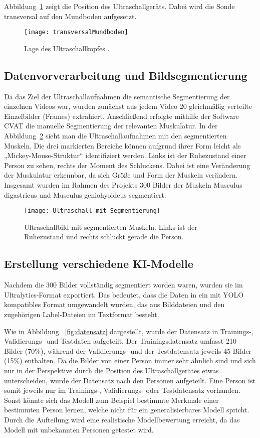 \documentclass[
	german,
	accentcolor=10c,%
	type=intern,
	marginpar=false
	]{tudapub}
\begin{document}
Abbildung~\ref{fig:transversalMundboden} zeigt die Position des Ultraschallgeräts. Dabei wird die Sonde transversal auf den Mundboden aufgesetzt. 

\begin{figure}[H]
    \centering
    \texttt{[image: transversalMundboden]}
    \caption{Lage des Ultraschallkopfes \cite{mundboden}.}
    \label{fig:transversalMundboden}
\end{figure}

\subsection{Datenvorverarbeitung und Bildsegmentierung}
Da das Ziel der Ultraschallaufnahmen die semantische Segmentierung der einzelnen Videos war, wurden zunächst aus jedem Video 20 gleichmäßig verteilte Einzelbilder (Frames) extrahiert. Anschließend erfolgte mithilfe der Software CVAT die manuelle Segmentierung der relevanten Muskulatur. In der Abbildung~\ref{fig:Ultraschall_mit_Segmentierung} sieht man die Ultraschallaufnahmen mit den segmentierten Muskeln. Die drei markierten Bereiche können aufgrund ihrer Form leicht als „Mickey-Mouse-Struktur“ identifiziert werden. Links ist der Ruhezustand einer Person zu sehen, rechts der Moment des Schluckens. Dabei ist eine Veränderung der Muskulatur erkennbar, da sich Größe und Form der Muskeln verändern. Insgesamt wurden im Rahmen des Projekts 300 Bilder der Muskeln Musculus digastricus und Musculus geniohyoideus segmentiert. 

\begin{figure}[H]
    \centering
    \texttt{[image: Ultraschall\_mit\_Segmentierung]}
    \caption{Ultraschallbild mit segmentierten Muskeln. Links ist der Ruhezustand und rechts schluckt gerade die Person.}
    \label{fig:Ultraschall_mit_Segmentierung}
\end{figure}

\subsection{Erstellung verschiedene KI-Modelle}
Nachdem die 300 Bilder vollständig segmentiert worden waren, wurden sie im Ultralytics-Format exportiert. Das bedeutet, dass die Daten in ein mit YOLO kompatibles Format umgewandelt wurden, das aus Bilddateien und den zugehörigen Label-Dateien im Textformat besteht.

Wie in Abbildung ~\ref{fig:datensatz} dargestellt, wurde der Datensatz in Trainings-, Validierungs- und Testdaten aufgeteilt. Der Trainingsdatensatz umfasst 210 Bilder (70\%), während der Validierungs- und der Testdatensatz jeweils 45 Bilder (15\%) enthalten. Da die Bilder von einer Person immer sehr ähnlich sind und sich nur in der Perspektive durch die Position des Ultraschallgerätes etwas unterscheiden, wurde der Datensatz nach den Personen aufgeteilt. Eine Person ist somit jeweils nur im Trainings-, Validierungs- oder Testdatensatz vorhanden. Sonst könnte sich das Modell zum Beispiel bestimmte Merkmale einer bestimmten Person lernen, welche nicht für ein generalisierbares Modell spricht. Durch die Aufteilung wird eine realistische Modellbewertung erreicht, da das Modell mit unbekannten Personen getestet wird.
\end{document}

